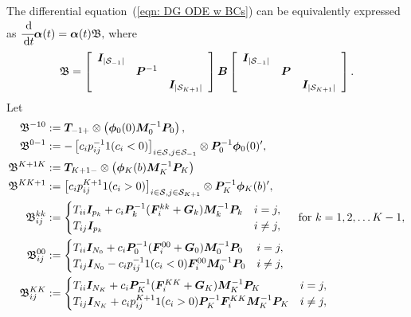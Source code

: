The differential equation~(\ref{eqn: DG ODE w BCs}) can be equivalently expressed as 
\(\label{eqn: DG alpha ODE w BCs}
	\cfrac{\, \mathrm{d}}{\, \mathrm{d} t} \boldsymbol \alpha(t)
	= \boldsymbol \alpha(t)  { \mathfrak{\boldsymbol B}},
\)
where 
\[ {\mathfrak{\boldsymbol B}} = \left[\begin{array}{ccc}
		\boldsymbol I_{|\mathcal{S}_{-1}|} & & \\
		& \boldsymbol P^{-1} &  \\
		& & \boldsymbol I_{|\mathcal{S}_{K+1}|}
	\end{array}\right]
	\boldsymbol B
	\left[\begin{array}{ccc}
		\boldsymbol I_{|\mathcal{S}_{-1}|} & & \\
		& \boldsymbol P&  \\
		& & \boldsymbol I_{|\mathcal{S}_{K+1}|}
	\end{array}\right].\] 
Let
\begin{align*}
 {  {\mathfrak{\bs B}}}^{{-1}0} &:= \bs T_{{-1}+}\otimes\left( \boldsymbol\phi_0(0)\bs M_0^{-1}\bs P_0\right),
 \\ {  {\mathfrak{\bs B}}}^{0{-1}} &:=-\left[c_ip_{ij}^{-1} 1{(c_i<0)}\right]_{i\in\calS,j\in\calS_{{-1}}}\otimes \bs P_0^{-1}\boldsymbol \phi_0(0)\tr{},
 \\ {  {\mathfrak{\bs B}}}^{{K+1} K} &:= \bs T_{{K+1}-}\otimes \left(\boldsymbol\phi_K(b)\bs M_K^{-1}\bs P_K\right)
 \\ {  {\mathfrak{\bs B}}}^{K {K+1}} &:= \left[c_ip_{ij}^{K+1} 1{(c_i>0)}\right]_{i\in\calS,j\in\calS_{K+1}} \otimes  \bs P_K^{-1} \boldsymbol\phi_K(b)\tr{},
 \\\mathfrak{\bs B}^{kk}_{ij} &:= \begin{cases}
    	T_{ii}\bs I_{p_k} + c_i\bs P_k^{-1}(\bs F_i^{kk}+\bs G_k)\bs M_k^{-1}\bs P_k & i = j, \\
	T_{ij}\bs I_{p_k} & i \neq j,
    \end{cases}\quad \mbox{ for \(k=1,2,\dots K-1\),}
 \\\mathfrak{\bs B}^{00}_{ij} &:= \begin{cases}
	T_{ii}\bs I_{N_0} + c_i\bs P_0^{-1}(\bs F_i^{00}+\bs G_0)\bs M_0^{-1}\bs P_0 & i = j, \\
T_{ij}\bs I_{N_0} - c_ip_{ij}^{-1} 1(c_i<0)\bs F_i^{00}\bs M_0^{-1}\bs P_0 & i \neq j,
\end{cases}
%
\\\mathfrak{\bs B}^{KK}_{ij} &:= \begin{cases}
	T_{ii}\bs I_{N_K} + c_i\bs P_K^{-1}(\bs F_i^{KK}+\bs G_K)\bs M_K^{-1}\bs P_K & i = j, \\
T_{ij}\bs I_{N_K} + c_ip_{ij}^{K+1} 1(c_i>0)\bs P_K^{-1}\bs F_i^{KK}\bs M_K^{-1}\bs P_K & i \neq j,

\end{cases}
\end{align*}
